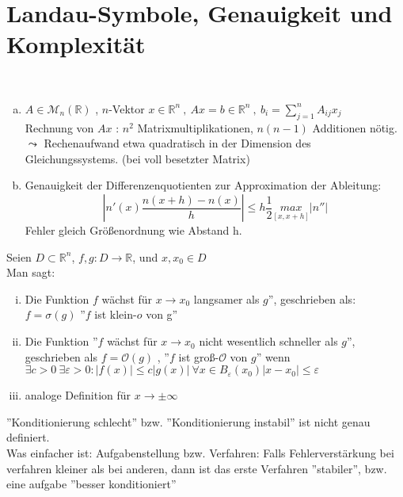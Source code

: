 \section{Landau-Symbole, Genauigkeit und Komplexität}
\begin{example}\hfill\\
\begin{enumerate}[(a)]
    \item $A\in\mathcal{M}_n(\mathbb{R})$ , $n$-Vektor $x\in\mathbb{R}^n \ , \ Ax=b\in\mathbb{R}^n \ , \ b_i=\sum_{j=1}^n A_{ij}x_j$\\
    Rechnung von $Ax$ : $n^2$ Matrixmultiplikationen, $n(n-1)$ Additionen nötig.
    $\leadsto$ Rechenaufwand etwa quadratisch in der Dimension des Gleichungssystems. (bei voll besetzter Matrix)

    \item Genauigkeit der Differenzenquotienten zur Approximation der Ableitung:
    $$\left|n'(x)\frac{n(x+h)-n(x)}{h}\right|\leq h\frac{1}{2}\underset{[x,x+h]}{max}|n''|$$ Fehler gleich Größenordnung wie Abstand h.
        
\end{enumerate}
\end{example}
\begin{definition}
    Seien $D\subset \mathbb{R}^n$, $f,g:D\to\mathbb{R}$, und $x,x_0\in D$\\
    Man sagt:
    \begin{enumerate}[i)]
        \item Die Funktion $f$ wächst für $x\to x_0$ langsamer als $g$'', geschrieben als: $f=\sigma(g)$ ''$f$ ist klein-$o$ von g''
        \item Die Funktion ''$f$ wächst für $x\to x_0$ nicht wesentlich schneller als $g$'', geschrieben als $f=\mathcal{O}(g)$ , ''$f$ ist groß-$\mathcal{O}$ von $g$''
        wenn $\exists c >0 \  \exists \varepsilon > 0: |f(x)| \leq c|g(x)| \ \forall x \in B_\varepsilon(x_0) |x-x_0|\leq \varepsilon$
        \item analoge Definition für $x\to \pm \infty$
    \end{enumerate}
\end{definition}

\begin{remark} ''Konditionierung schlecht'' bzw. ''Konditionierung instabil'' ist nicht genau definiert.\\ Was einfacher ist: Aufgabenstellung bzw. Verfahren: Falls Fehlerverstärkung bei verfahren kleiner als bei anderen, dann ist das erste Verfahren ''stabiler'', bzw. eine aufgabe ''besser konditioniert''
\end{remark}

